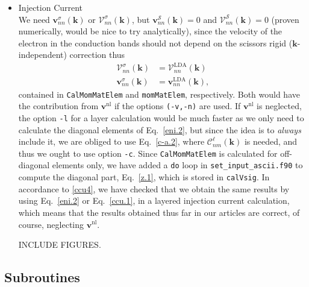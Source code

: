 \begin{itemize}
\item Injection Current\\
We need 
$\mathbf{v}^\sigma_{nn}(\mathbf{k})$
 or 
$\boldsymbol{\mathcal{V}}^\sigma_{nn}(\mathbf{k})$, but $\mathbf{v}^\mathcal{S}_{nn}(\mathbf{k})=0$
and 
$\boldsymbol{\mathcal{V}}^\mathcal{S}_{nn}(\mathbf{k})=0$ (proven numerically, would be nice to try
analytically), since the velocity of the electron in the conduction
bands should not depend on the scissors rigid ($\mathbf{k}$-independent) correction thus
\begin{align}\label{z.1}
\boldsymbol{\mathcal{V}}^\sigma_{nn}(\mathbf{k})&=\boldsymbol{\mathcal{V}}^\mathrm{LDA}_{nn}(\mathbf{k})
\nonumber\\ 
\mathbf{v}^\sigma_{nn}(\mathbf{k})&=\mathbf{v}^\mathrm{LDA}_{nn}(\mathbf{k}) 
,
\end{align}
contained in  \verb=CalMomMatElem= and  \verb=momMatElem=,
respectively. Both would have the contribution from $\mathbf{v}^\mathrm{nl}$ if the
options \verb=(-v,-n)= are used. If $\mathbf{v}^\mathrm{nl}$ is neglected, the
option \verb=-l= for a layer calculation would be much faster as we
only need to calculate the diagonal elements of Eq.~\eqref{eni.2}, but
since the idea is to \emph{always} include it, we are obliged to use
Eq.~\eqref{c-a.2}, where $\mathcal{C}^\ell_{nm}(\mathbf{k})$ is needed, and thus
we ought to use option \verb=-c=. 
Since  \verb=CalMomMatElem= is calculated for off-diagonal elements
only, we have added a \verb=do= loop in \verb=set_input_ascii.f90=
 to compute the diagonal  part, Eq.~\eqref{z.1}, which is
stored in \verb=calVsig=. In accordance to \ref{ccu4}, we have checked
that we obtain the same results by using Eq.~\eqref{eni.2} or
Eq.~\eqref{ccu.1}, in a layered injection current calculation, which
means that the results obtained thus far in our articles are correct,
of course, neglecting $\mathbf{v}^\mathrm{nl}$.

INCLUDE FIGURES.
\end{itemize}



\subsection{Subroutines}

